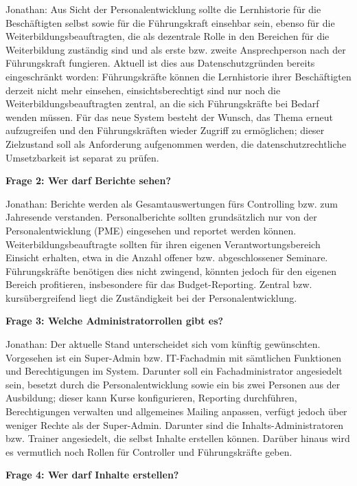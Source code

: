 \documentclass[
    12pt, 
    a4paper,
    ]{scrartcl} %
\begin{document}
Jonathan: Aus Sicht der Personalentwicklung sollte die Lernhistorie f\"ur die Besch\"aftigten selbst sowie f\"ur die F\"uhrungskraft einsehbar sein, ebenso f\"ur die Weiterbildungsbeauftragten, die als dezentrale Rolle in den Bereichen f\"ur die Weiterbildung zust\"andig sind und als erste bzw. zweite Ansprechperson nach der F\"uhrungskraft fungieren. Aktuell ist dies aus Datenschutzgr\"unden bereits eingeschr\"ankt worden: F\"uhrungskr\"afte k\"onnen die Lernhistorie ihrer Besch\"aftigten derzeit nicht mehr einsehen, einsichtsberechtigt sind nur noch die Weiterbildungsbeauftragten zentral, an die sich F\"uhrungskr\"afte bei Bedarf wenden m\"ussen. F\"ur das neue System besteht der Wunsch, das Thema erneut aufzugreifen und den F\"uhrungskr\"aften wieder Zugriff zu erm\"oglichen; dieser Zielzustand soll als Anforderung aufgenommen werden, die datenschutzrechtliche Umsetzbarkeit ist separat zu pr\"ufen.

\medskip
\textbf{Frage 2: Wer darf Berichte sehen?}

Jonathan: Berichte werden als Gesamtauswertungen f\"urs Controlling bzw. zum Jahresende verstanden. Personalberichte sollten grunds\"atzlich nur von der Personalentwicklung (PME) eingesehen und reportet werden k\"onnen. Weiterbildungsbeauftragte sollten f\"ur ihren eigenen Verantwortungsbereich Einsicht erhalten, etwa in die Anzahl offener bzw. abgeschlossener Seminare. F\"uhrungskr\"afte ben\"otigen dies nicht zwingend, k\"onnten jedoch f\"ur den eigenen Bereich profitieren, insbesondere f\"ur das Budget-Reporting. Zentral bzw. kurs\"ubergreifend liegt die Zust\"andigkeit bei der Personalentwicklung.

\medskip
\textbf{Frage 3: Welche Administratorrollen gibt es?}

Jonathan: Der aktuelle Stand unterscheidet sich vom k\"unftig gew\"unschten. Vorgesehen ist ein Super-Admin bzw. IT-Fachadmin mit s\"amtlichen Funktionen und Berechtigungen im System. Darunter soll ein Fachadministrator angesiedelt sein, besetzt durch die Personalentwicklung sowie ein bis zwei Personen aus der Ausbildung; dieser kann Kurse konfigurieren, Reporting durchf\"uhren, Berechtigungen verwalten und allgemeines Mailing anpassen, verf\"ugt jedoch \"uber weniger Rechte als der Super-Admin. Darunter sind die Inhalts-Administratoren bzw. Trainer angesiedelt, die selbst Inhalte erstellen k\"onnen. Dar\"uber hinaus wird es vermutlich noch Rollen f\"ur Controller und F\"uhrungskr\"afte geben.

\medskip
\textbf{Frage 4: Wer darf Inhalte erstellen?}
\end{document}
